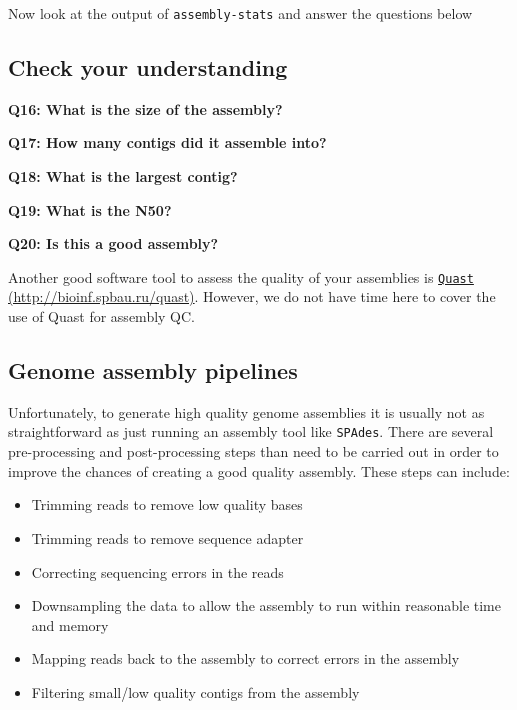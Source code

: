 \documentclass[11pt]{article}
\providecommand{\tightlist}{%
      \setlength{\itemsep}{0pt}\setlength{\parskip}{0pt}}
\begin{document}
    Now look at the output of \texttt{assembly-stats} and answer the
questions below

    \hypertarget{check-your-understanding}{%
\subsection{Check your understanding}\label{check-your-understanding}}

\textbf{Q16: What is the size of the assembly?}

\textbf{Q17: How many contigs did it assemble into?}

\textbf{Q18: What is the largest contig?}

\textbf{Q19: What is the N50?}

\textbf{Q20: Is this a good assembly?}

    Another good software tool to assess the quality of your assemblies is
\href{http://bioinf.spbau.ru/quast}{\texttt{Quast}
(http://bioinf.spbau.ru/quast)}. However, we do not have time here to
cover the use of Quast for assembly QC.

    \hypertarget{genome-assembly-pipelines}{%
\subsection{Genome assembly pipelines}\label{genome-assembly-pipelines}}

Unfortunately, to generate high quality genome assemblies it is usually
not as straightforward as just running an assembly tool like
\texttt{SPAdes}. There are several pre-processing and post-processing
steps than need to be carried out in order to improve the chances of
creating a good quality assembly. These steps can include:

\begin{itemize}
\tightlist
\item
  Trimming reads to remove low quality bases
\item
  Trimming reads to remove sequence adapter
\item
  Correcting sequencing errors in the reads
\item
  Downsampling the data to allow the assembly to run within reasonable
  time and memory
\item
  Mapping reads back to the assembly to correct errors in the assembly
\item
  Filtering small/low quality contigs from the assembly
\end{itemize}
\end{document}
